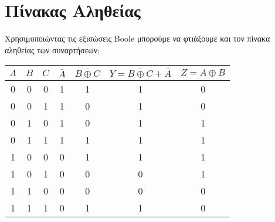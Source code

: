 \documentclass[]{article}
\begin{document}
\section{Πίνακας Αληθείας}
Χρησιμοποιώντας τις εξισώσεις Boole μπορούμε να φτιάξουμε και τον πίνακα αληθείας των συναρτήσεων:
\begin{center}
	\begin{tabular}{|c|c|c|c|c|c|c|}
		\hline \rule{0pt}{11pt} $A$ & $B$ & $C$ & $\bar{A}$ & $\overline{B \oplus C}$ & $Y = \overline{B \oplus C} + \bar{A}$ & $Z = A \oplus B$ \\
		\hline 0                    & 0   & 0   & 1         & 1                       & 1                                     & 0                \\
		0                           & 0   & 1   & 1         & 0                       & 1                                     & 0                \\
		0                           & 1   & 0   & 1         & 0                       & 1                                     & 1                \\
		0                           & 1   & 1   & 1         & 1                       & 1                                     & 1                \\
		1                           & 0   & 0   & 0         & 1                       & 1                                     & 1                \\
		1                           & 0   & 1   & 0         & 0                       & 0                                     & 1                \\
		1                           & 1   & 0   & 0         & 0                       & 0                                     & 0                \\
		1                           & 1   & 1   & 0         & 1                       & 1                                     & 0                \\
		\hline
	\end{tabular}
\end{center}
\end{document}

